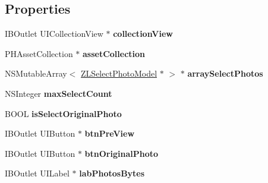 \subsection*{Properties}
\begin{DoxyCompactItemize}
\item 
\mbox{\label{interface_z_l_thumbnail_view_controller_ad1db58d72ddbb226b9f68b21752fe6d8}} 
I\+B\+Outlet U\+I\+Collection\+View $\ast$ {\bfseries collection\+View}
\item 
\mbox{\label{interface_z_l_thumbnail_view_controller_a428374b7e9d8ad9dc65625ce14aa688d}} 
P\+H\+Asset\+Collection $\ast$ {\bfseries asset\+Collection}
\item 
\mbox{\label{interface_z_l_thumbnail_view_controller_a3baa64cd2fe503e1df96e4eee55d23b5}} 
N\+S\+Mutable\+Array$<$ \mbox{\hyperlink{interface_z_l_select_photo_model}{Z\+L\+Select\+Photo\+Model}} $\ast$ $>$ $\ast$ {\bfseries array\+Select\+Photos}
\item 
\mbox{\label{interface_z_l_thumbnail_view_controller_a764a6c81b8003dc559844782c2ee7513}} 
N\+S\+Integer {\bfseries max\+Select\+Count}
\item 
\mbox{\label{interface_z_l_thumbnail_view_controller_afc082b6b1596a011fa1425b92c0b5786}} 
B\+O\+OL {\bfseries is\+Select\+Original\+Photo}
\item 
\mbox{\label{interface_z_l_thumbnail_view_controller_a29faf4a0670c720afdff7eb0fd492bbb}} 
I\+B\+Outlet U\+I\+Button $\ast$ {\bfseries btn\+Pre\+View}
\item 
\mbox{\label{interface_z_l_thumbnail_view_controller_a4fb06296df426a82e477220056167e1d}} 
I\+B\+Outlet U\+I\+Button $\ast$ {\bfseries btn\+Original\+Photo}
\item 
\mbox{\label{interface_z_l_thumbnail_view_controller_adc963021e1c8a0ffe6223ee2887ed784}} 
I\+B\+Outlet U\+I\+Label $\ast$ {\bfseries lab\+Photos\+Bytes}

\end{DoxyCompactItemize}
